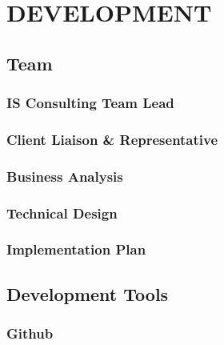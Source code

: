 \documentclass[letterpaper,12pt,2p]{elsarticle}
\begin{document}
\section{ DEVELOPMENT}%
\label{FEA}%



\subsection{ Team}
\label{subsec1}


\subsubsection{ IS Consulting Team Lead}
\label{subsec1}

\subsubsection{ Client Liaison \& Representative }
\label{subsec1}

\subsubsection{ Business Analysis}
\label{subsec1}

\subsubsection{ Technical Design}
\label{subsec1}

\subsubsection{ Implementation Plan}
\label{subsec1}


\subsection{ Development Tools}
\label{subsec1}


\subsubsection{ Github}
\label{subsec1}
\end{document}
